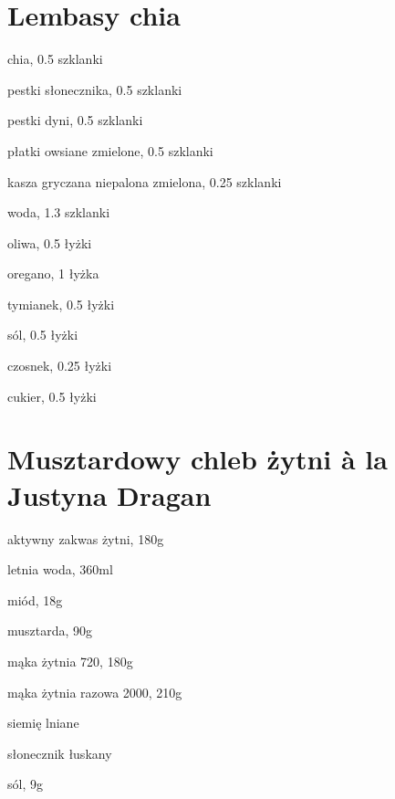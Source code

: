 
\recipend

\section{Lembasy chia}

\begin{ingreds}
\item{chia, 0.5 szklanki}
\item{pestki słonecznika, 0.5 szklanki}
\item{pestki dyni, 0.5 szklanki}
\item{płatki owsiane zmielone, 0.5 szklanki}
\item{kasza gryczana niepalona zmielona, 0.25 szklanki}
\item{woda, 1.3 szklanki}
\item{oliwa, 0.5 łyżki}
\item{oregano, 1 łyżka}
\item{tymianek, 0.5 łyżki}
\item{sól, 0.5 łyżki}
\item{czosnek, 0.25 łyżki}
\item{cukier, 0.5 łyżki}
\end{ingreds}


\commentskip

\recipend

\section{Musztardowy chleb żytni à la Justyna Dragan}

\begin{ingreds}
\item{aktywny zakwas żytni, 180g}
\item{letnia woda, 360ml}
\item{miód, 18g}
\item{musztarda, 90g}
\item{mąka żytnia 720, 180g}
\item{mąka żytnia razowa 2000, 210g}
\item{siemię lniane}
\item{słonecznik łuskany}
\item{sól, 9g}
\end{ingreds}

